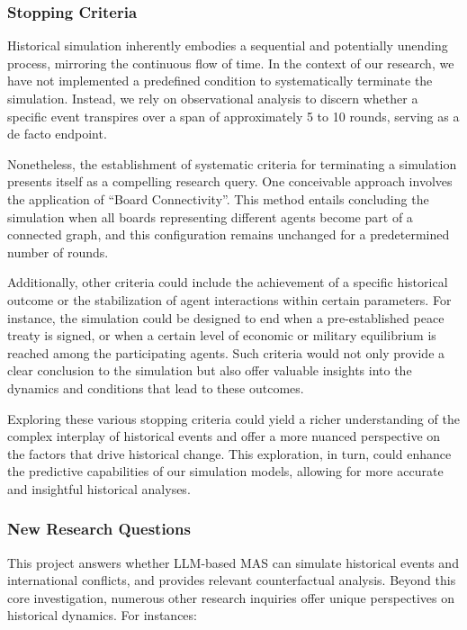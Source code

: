\documentclass{article}
\begin{document}

\subsubsection{Stopping Criteria}
Historical simulation inherently embodies a sequential and potentially unending process, mirroring the continuous flow of time. In the context of our research, we have not implemented a predefined condition to systematically terminate the simulation. Instead, we rely on observational analysis to discern whether a specific event transpires over a span of approximately 5 to 10 rounds, serving as a de facto endpoint.

Nonetheless, the establishment of systematic criteria for terminating a simulation presents itself as a compelling research query. One conceivable approach involves the application of ``Board Connectivity''. This method entails concluding the simulation when all boards representing different agents become part of a connected graph, and this configuration remains unchanged for a predetermined number of rounds.

Additionally, other criteria could include the achievement of a specific historical outcome or the stabilization of agent interactions within certain parameters. For instance, the simulation could be designed to end when a pre-established peace treaty is signed, or when a certain level of economic or military equilibrium is reached among the participating agents. Such criteria would not only provide a clear conclusion to the simulation but also offer valuable insights into the dynamics and conditions that lead to these outcomes.

Exploring these various stopping criteria could yield a richer understanding of the complex interplay of historical events and offer a more nuanced perspective on the factors that drive historical change. This exploration, in turn, could enhance the predictive capabilities of our simulation models, allowing for more accurate and insightful historical analyses.

\subsubsection{New Research Questions}
This project answers whether LLM-based MAS can simulate historical events and international conflicts, and provides relevant counterfactual analysis. Beyond this core investigation, numerous other research inquiries offer unique perspectives on historical dynamics. For instances:
\end{document}
